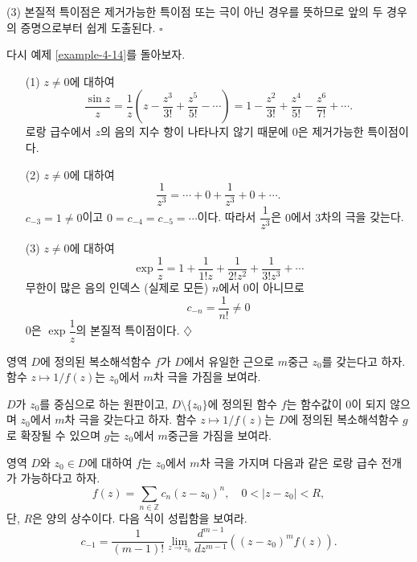 (3) 본질적 특이점은 제거가능한 특이점 또는 극이 아닌 경우를 뜻하므로
앞의 두 경우의 증명으로부터 쉽게 도출된다.
\hfill $\square$

다시 예제 \ref{example-4-14}를 돌아보자.

\begin{saltexample}{}{}\label{example-4-16}

\begin{itemize}
\item[(1)] $z\ne0$에 대하여
\[
\dfrac{\sin z}z = \dfrac 1z\left( z - \dfrac{z^3}{3!} + \dfrac{z^5}{5!} - \cdots
\right) =1 - \dfrac{z^2}{3!} + \dfrac{z^4}{5!} - \dfrac{z^6}{7!} + \cdots.
\]
로랑 급수에서 $z$의 음의 지수 항이 나타나지 않기 때문에
$0$은 제거가능한 특이점이다.
\item[(2)] $z\ne0$에 대하여 
\[
\dfrac1{z^3} = \cdots + 0 + \dfrac1{z^3} + 0 + \cdots.
\]
$c_{-3}=1 \ne 0$이고 $0=c_{-4} = c_{-5} = \cdots$이다.
따라서 $\dfrac1{z^3}$은 $0$에서 $3$차의 극을 갖는다.
\item[(3)] $z\ne0$에 대하여 
\[
\exp \dfrac1z = 1 + \dfrac1{1!z} + \dfrac1{2!z^2} + \dfrac1{3!z^3} + \cdots
\]
무한이 많은 음의 인덱스 (실제로 모든) $n$에서 $0$이 아니므로
\[
c_{-n} = \dfrac1{n!} \ne 0
\]
$0$은 $\exp \dfrac1z$의 본질적 특이점이다.
\hfill $\diamondsuit$
\end{itemize}
\end{saltexample}

\begin{salt_exercise}\label{ex-4-30}
영역 $D$에 정의된 복소해석함수 $f$가 $D$에서 유일한 근으로
$m$중근 $z_0$를 갖는다고 하자.
함수 $z\mapsto 1/f(z)$는 $z_0$에서 $m$차 극을 가짐을 보여라.
\end{salt_exercise}

\begin{salt_exercise}\label{ex-4-31}
$D$가 $z_0$를 중심으로 하는 원판이고, 
$D\setminus \{z_0\}$에 정의된 함수 $f$는 함수값이 $0$이 되지 않으며
$z_0$에서 $m$차 극을 갖는다고 하자. 
함수 $z\mapsto 1/f(z)$는 $D$에 정의된 복소해석함수 $g$로 확장될 수 있으며
$g$는 $z_0$에서 $m$중근을 가짐을 보여라.
\end{salt_exercise}

\begin{salt_exercise}\label{ex-4-32}
영역 $D$와  $z_0\in D$에 대하여
$f$는 $z_0$에서 $m$차 극을 가지며 다음과 같은 로랑 급수 전개가 가능하다고 하자.
\[
f(z) = \sum_{n\in\mathbb Z} c_n(z-z_0)^n,\quad
0<|z-z_0|<R,
\]
단, $R$은 양의 상수이다. 다음 식이 성립함을 보여라.
\[
c_{-1} = \dfrac1{(m-1)!}\lim_{z\to z_0} \dfrac{d^{m-1}}{dz^{m-1}}
\left( (z-z_0)^m f(z) \right).
\]
\end{salt_exercise}

